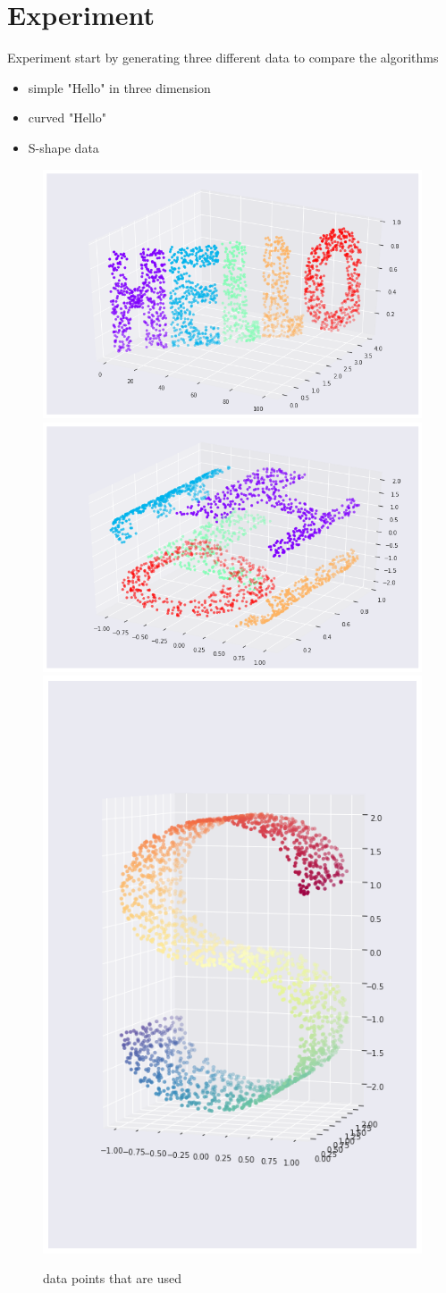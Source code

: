 \documentclass[10pt]{beamer}
\begin{document}
\section{Experiment}
\begin{frame}{Experiment}
  start by generating three different data to compare the algorithms
  \begin{itemize}
  \item  simple "Hello" in three dimension 
  \item  curved "Hello" 
  \item  S-shape data 
  \end{itemize}
  
 \begin{figure}[htp]

\centering
\includegraphics[width=.4\textwidth]{3_dhello_linear_gussian.png}\hfill
\includegraphics[width=.4\textwidth]{curved_hello.png}
\includegraphics[width=.2\textwidth]{s_3d.png}
\caption{data points that are used}
\end{figure}
\end{frame}
\end{document}

